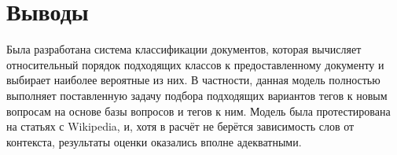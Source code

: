 \section{Выводы}

\indent Была разработана система классификации документов, которая вычисляет относительный порядок подходящих классов к предоставленному документу и выбирает наиболее вероятные из них. В частности, данная модель полностью выполняет поставленную задачу подбора подходящих вариантов тегов к новым вопросам на основе базы вопросов и тегов к ним. Модель была протестирована на статьях с Wikipedia, и, хотя в расчёт не берётся зависимость слов от контекста, результаты оценки оказались вполне адекватными. 

\pagebreak
